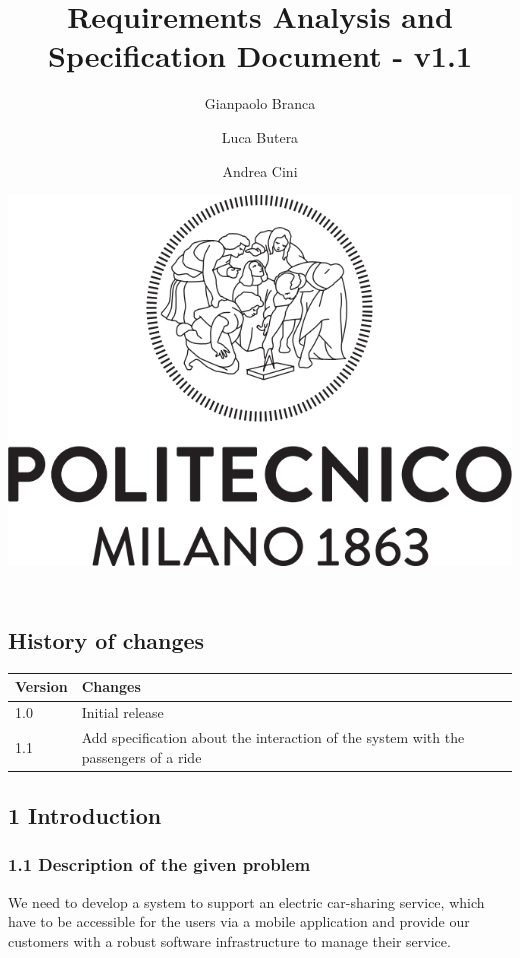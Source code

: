 \documentclass[]{article}
\title{\textbf{Requirements Analysis and Specification Document - v1.1}}
\author{Gianpaolo Branca \and Luca Butera \and Andrea Cini \newline}
\date{\includegraphics{polimi.png}\newpage}
\begin{document}
\maketitle

{
\setcounter{tocdepth}{3}
\tableofcontents
}
\newpage

\subsection{History of changes}\label{history-of-changes}

\begin{longtable}[]{@{}ll@{}}
\toprule
\begin{minipage}[b]{0.11\columnwidth}\raggedright\strut
Version\strut
\end{minipage} & \begin{minipage}[b]{0.83\columnwidth}\raggedright\strut
Changes\strut
\end{minipage}\tabularnewline
\midrule
\endhead
\begin{minipage}[t]{0.11\columnwidth}\raggedright\strut
1.0\strut
\end{minipage} & \begin{minipage}[t]{0.83\columnwidth}\raggedright\strut
Initial release\strut
\end{minipage}\tabularnewline
\begin{minipage}[t]{0.11\columnwidth}\raggedright\strut
1.1\strut
\end{minipage} & \begin{minipage}[t]{0.83\columnwidth}\raggedright\strut
Add specification about the interaction of the system with the
passengers of a ride\strut
\end{minipage}\tabularnewline
\bottomrule
\end{longtable}

\newpage

\subsection{1 Introduction}\label{introduction}

\subsubsection{1.1 Description of the given
problem}\label{description-of-the-given-problem}

We need to develop a system to support an electric car-sharing service,
which have to be accessible for the users via a mobile application and
provide our customers with a robust software infrastructure to manage
their service.
\end{document}

